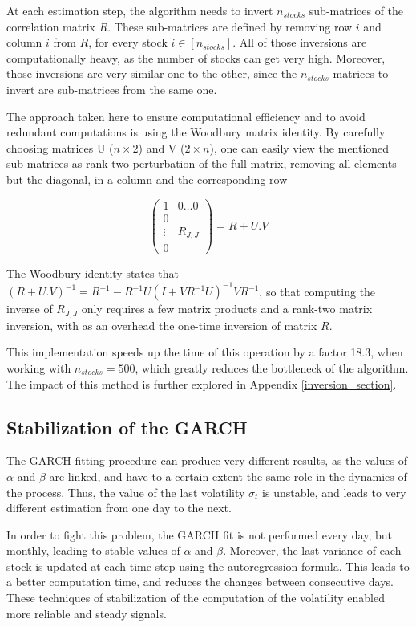\documentclass[letterpaper, 10 pt, conference]{ieeeconf}  %
\begin{document}
At each estimation step, the algorithm needs to invert $n_{stocks}$ sub-matrices of the correlation matrix $R$. These sub-matrices are defined by removing row $i$ and column $i$ from $R$, for every stock $i \in [n_{stocks}]$. All of those inversions are computationally heavy, as the number of stocks can get very high. Moreover, those inversions are very similar one to the other, since the $n_{stocks}$ matrices to invert are sub-matrices from the same one.

The approach taken here to ensure computational efficiency and to avoid redundant computations is using the Woodbury matrix identity. By carefully choosing matrices U ($n\times 2$) and V ($2\times n$), one can easily view the mentioned sub-matrices as rank-two perturbation of the full matrix, removing all elements but the diagonal, in a column and the corresponding row

$$
\left( 
\begin{array}{ll}
1 &0 \dots 0  \\
0 &  \\
\vdots &R_{J, J}\\
0 
\end{array}
\right) = R + U.V
$$

The Woodbury identity states that $(R + U.V)^{-1} = R^{-1} - R^{-1}U(I + VR^{-1}U)^{-1}VR^{-1}$, so that computing the inverse of $R_{J, J}$ only requires a few matrix products and a rank-two matrix inversion, with as an overhead the one-time inversion of matrix $R$. 

This implementation speeds up the time of this operation by a factor 18.3, when working with $n_{stocks}=500$, which greatly reduces the bottleneck of the algorithm. The impact of this method is further explored in Appendix \ref{inversion_section}.

\subsection{Stabilization of the GARCH}

The GARCH fitting procedure can produce very different results, as the values of $\alpha$ and $\beta$ are linked, and have to a certain extent the same role in the dynamics of the process. Thus, the value of the last volatility $\sigma_t$ is unstable, and leads to very different estimation from one day to the next.

In order to fight this problem, the GARCH fit is not performed every day, but monthly, leading to stable values of $\alpha$ and $\beta$. Moreover, the last variance of each stock is updated at each time step using the autoregression formula. This leads to a better computation time, and reduces the changes between consecutive days. These techniques of stabilization of the computation of the volatility enabled more reliable and steady signals.
\end{document}
